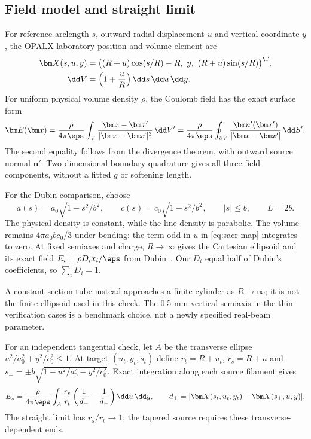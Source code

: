 \subsection{Field model and straight limit}
For reference arclength $s$, outward radial displacement $u$ and vertical
coordinate $y$, the OPALX laboratory position and volume element are
\begin{align}
 \bm X(s,u,y)&=\big((R+u)\cos(s/R)-R,\ y,\ (R+u)\sin(s/R)\big)^\T,\\
 \dd V&=\left(1+\frac{u}{R}\right)\dd s\,\dd u\,\dd y.
 \label{eq:sacr-map}
\end{align}
For uniform physical volume density $\rho$, the Coulomb field has the exact
surface form
\begin{equation}
 \bm E(\bm x)=\frac{\rho}{4\pi\eps}
 \int_V\frac{\bm x-\bm x'}{|\bm x-\bm x'|^3}\,\dd V'
 =\frac{\rho}{4\pi\eps}
 \oint_{\partial V}\frac{\bm n'(\bm x')}{|\bm x-\bm x'|}\,\dd S'.
 \label{eq:sacr-surface}
\end{equation}
The second equality follows from the divergence theorem, with outward source
normal $\bm n'$. Two-dimensional boundary quadrature gives all three field
components, without a fitted $g$ or softening length.

For the Dubin comparison, choose
\begin{equation}
 a(s)=a_0\sqrt{1-s^2/b^2},\qquad
 c(s)=c_0\sqrt{1-s^2/b^2},\qquad |s|\le b,\qquad L=2b.
 \label{eq:sacr-taper}
\end{equation}
The physical density is constant, while the line density is parabolic.
The volume remains $4\pi a_0bc_0/3$ under bending: the term odd in $u$ in
\cref{eq:sacr-map} integrates to zero. At fixed semiaxes and charge,
$R\to\infty$ gives the Cartesian ellipsoid and its exact field
$E_i=\rho D_i x_i/\eps$ from Dubin~\cite{dubin}. Our $D_i$ equal half of
Dubin's coefficients, so $\sum_iD_i=1$.

A constant-section tube instead approaches a finite cylinder as $R\to\infty$;
it is not the finite ellipsoid used in this check. The 0.5 mm vertical semiaxis
in the thin verification cases is a benchmark choice, not a newly specified
real-beam parameter.

For an independent tangential check, let $A$ be the transverse ellipse
$u^2/a_0^2+y^2/c_0^2\le1$. At target $(u_t,y_t,s_t)$ define
$r_t=R+u_t$, $r_s=R+u$ and
$s_\pm=\pm b\sqrt{1-u^2/a_0^2-y^2/c_0^2}$. Exact integration along each
source filament gives
\begin{equation}
 E_s=\frac{\rho}{4\pi\eps}\int_A\frac{r_s}{r_t}
 \left(\frac{1}{d_+}-\frac{1}{d_-}\right)\dd u\,\dd y,
 \qquad d_\pm=|\bm X(s_t,u_t,y_t)-\bm X(s_\pm,u,y)|.
 \label{eq:sacr-endpoint}
\end{equation}
The straight limit has $r_s/r_t\to1$; the tapered source requires these
transverse-dependent ends.

